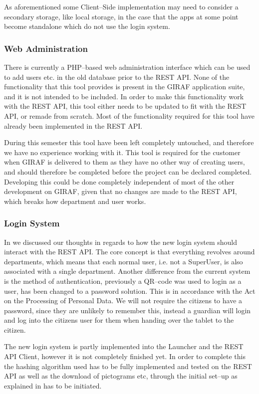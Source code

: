 As aforementioned some Client--Side implementation may need to consider a secondary storage, like local storage, in the case that the apps at some point become standalone which do not use the login system.

\subsubsection*{Web Administration}
There is currently a PHP--based web administration interface which can be used to add users etc. in the old database prior to the REST API.
None of the functionality that this tool provides is present in the GIRAF application suite, and it is not intended to be included.
In order to make this functionality work with the REST API, this tool either needs to be updated to fit with the REST API, or remade from scratch.
Most of the functionality required for this tool have already been implemented in the REST API.

During this semester this tool have been left completely untouched, and therefore we have no experience working with it.
This tool is required for the customer when GIRAF is delivered to them as they have no other way of creating users, and should therefore be completed before the project can be declared completed.
Developing this could be done completely independent of most of the other development on GIRAF, given that no changes are made to the REST API, which breaks how department and user works.

\subsubsection*{Login System}
In  we discussed our thoughts in regards to how the new login system should interact with the REST API.
The core concept is that everything revolves around departments, which means that each normal user, i.e. not a SuperUser, is also associated with a single department.
Another difference from the current system is the method of authentication, previously a QR--code was used to login as a user, has been changed to a password solution.
This is in accordance with the Act on the Processing of Personal Data.
We will not require the citizens to have a password, since they are unlikely to remember this, instead a guardian will login and log into the citizens user for them when handing over the tablet to the citizen.

The new login system is partly implemented into the Launcher and the REST API Client, however it is not completely finished yet.
In order to complete this the hashing algorithm used has to be fully implemented and tested on the REST API as well as the download of pictograms etc, through the initial set--up as explained in  has to be initiated.

